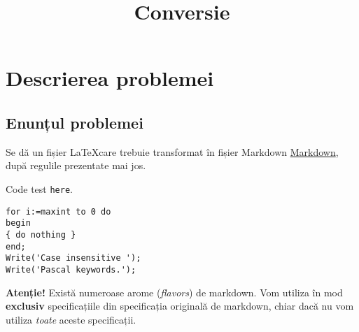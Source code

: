 \documentclass[a4paper, 12pt, twoside]{article}
\title{Conversie}\date{}
\begin{document}
\maketitle


\section{Descrierea problemei}\label{sec:problem}
\subsection{Enunțul problemei}\label{sec:problem:statement} 

Se dă un fișier \LaTeX care trebuie transformat în fișier Markdown \href{https://en.wikipedia.org/wiki/Markdown}{Markdown}, după regulile prezentate mai jos.

Code test \texttt{here}.

\begin{verbatim}
for i:=maxint to 0 do
begin
{ do nothing }
end;
Write('Case insensitive ');
Write('Pascal keywords.');
\end{verbatim}


\textbf{Atenție!} Există numeroase arome (\emph{flavors}) de markdown. Vom utiliza în mod \textbf{exclusiv} specificațiile din specificația originală de markdown, chiar dacă nu vom utiliza \emph{toate} aceste specificații.


\end{document}
